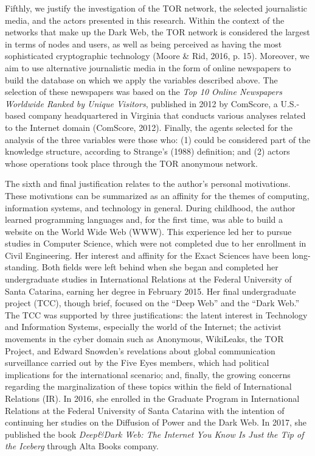Fifthly, we justify the investigation of the TOR network, the selected journalistic media, and the actors presented in this research. Within the context of the networks that make up the Dark Web, the TOR network is considered the largest in terms of nodes and users, as well as being perceived as having the most sophisticated cryptographic technology (Moore \& Rid, 2016, p. 15). 
Moreover, we aim to use alternative journalistic media in the form of online newspapers to build the database on which we apply the variables described above. The selection of these newspapers was based on the \textit{Top 10 Online Newspapers Worldwide Ranked by Unique Visitors}, published in 2012 by ComScore, a U.S.-based company headquartered in Virginia that conducts various analyses related to the Internet domain (ComScore, 2012). 
Finally, the agents selected for the analysis of the three variables were those who: (1) could be considered part of the knowledge structure, according to Strange's (1988) definition; and (2) actors whose operations took place through the TOR anonymous network.

The sixth and final justification relates to the author's personal motivations. These motivations can be summarized as an affinity for the themes of computing, information systems, and technology in general. During childhood, the author learned programming languages and, for the first time, was able to build a website on the World Wide Web (WWW). This experience led her to pursue studies in Computer Science, which were not completed due to her enrollment in Civil Engineering. Her interest and affinity for the Exact Sciences have been long-standing. Both fields were left behind when she began and completed her undergraduate studies in International Relations at the Federal University of Santa Catarina, earning her degree in February 2015. Her final undergraduate project (TCC), though brief, focused on the ``Deep Web'' and the ``Dark Web.'' The TCC was supported by three justifications: the latent interest in Technology and Information Systems, especially the world of the Internet; the activist movements in the cyber domain such as Anonymous, WikiLeaks, the TOR Project, and Edward Snowden's revelations about global communication surveillance carried out by the Five Eyes members, which had political implications for the international scenario; and, finally, the growing concerns regarding the marginalization of these topics within the field of International Relations (IR). In 2016, she enrolled in the Graduate Program in International Relations at the Federal University of Santa Catarina with the intention of continuing her studies on the Diffusion of Power and the Dark Web. In 2017, she published the book \textit{Deep\&Dark Web: The Internet You Know Is Just the Tip of the Iceberg} through Alta Books company.

